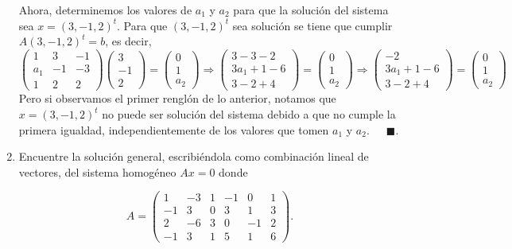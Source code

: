 \documentclass[11pt,letterpaper]{article}
\newcommand{\fin}{$\blacksquare.$}
\begin{document}
\begin{enumerate}
Ahora, determinemos los valores de $a_1$ y $a_2$ para que la solución del sistema sea $x=(3,-1,2)^t$. Para que $(3,-1,2)^t$ sea solución se tiene que cumplir $A(3,-1,2)^t=b$, es decir,
\begin{equation*}
\left( \begin{array}{rrr}
1 & 3 & -1\\
a_1 & -1 & -3\\
1 & 2 &2
\end{array} \right) \begin{pmatrix}
3\\
-1\\
2
\end{pmatrix}=
\left(\begin{array}{c}
0\\
1\\
a_2
\end{array}\right) \Rightarrow \begin{pmatrix}
3-3-2\\
3a_1+1-6\\
3-2+4
\end{pmatrix} = \begin{pmatrix}
0\\
1\\
a_2
\end{pmatrix} \Rightarrow \begin{pmatrix}
-2\\
3a_1+1-6\\
3-2+4
\end{pmatrix} = \begin{pmatrix}
0\\
1\\
a_2
\end{pmatrix}
\end{equation*}
Pero si observamos el primer renglón de lo anterior, notamos que $x=(3,-1, 2)^t$ no puede ser solución del sistema debido a que no cumple la primera igualdad, independientemente de los valores que tomen $a_1$ y $a_2$.\ \ \ \fin 

\item Encuentre la solución general, escribiéndola como combinación lineal de vectores, del sistema homogéneo $Ax=0$ donde

\begin{equation*}
A=\left(\begin{array}{rrrrrr}
1  & -3 & 1 & -1 &  0 & 1\\
-1 &  3 & 0 &  3 &  1 & 3 \\
2  & -6 & 3 &  0 & -1 & 2\\
-1 &  3 & 1 &  5 &  1 & 6
\end{array}\right).
\end{equation*}


\end{enumerate}
\end{document}
